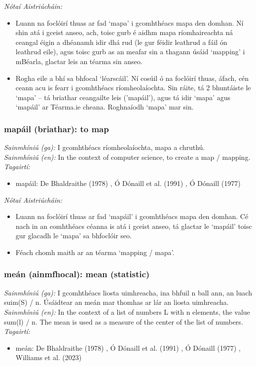 \documentclass{article}
\begin{document}
 \noindent \textit{Nótaí Aistriúcháin:}
\begin{itemize}
	\item Luann na foclóirí thuas ar fad `mapa' i gcomhthéacs mapa den domhan. Ní shin atá i gceist anseo, ach, toisc gurb é aidhm mapa ríomhaireachta ná ceangal éigin a dhéanamh idir dhá rud (le gur féidir leathrud a fáil ón leathrud eile), agus toisc gurb as an meafar sin a thagann úsáid `mapping' i mBéarla, glactar leis an téarma sin anseo.
	\item Rogha eile a bhí sa bhfocal `léarscáil'. Ní cosúil ó na foclóirí thuas, áfach, cén ceann acu is fearr i gcomhthéacs ríomheolaíochta. Sin ráite, tá 2 bhuntáiste le `mapa' -- tá briathar ceangailte leis ('mapáil'), agus tá idir `mapa' agus `mapáil' ar Téarma.ie cheana. Roghnaíodh `mapa' mar sin.
\end{itemize}


\subsubsection*{mapáil (briathar): to map}
 \noindent \textit{Sainmhíniú (ga):} I gcomhthéacs ríomheolaíochta, mapa a chruthú.
\\
 \noindent \textit{Sainmhíniú (en):} In the context of computer science, to create a map / mapping.
\\
 \noindent \textit{Tagairtí:}
\begin{itemize}
	\item mapáil: De Bhaldraithe (1978) \cite{de-bhaldraithe}, Ó Dónaill et al. (1991) \cite{focloir-beag}, Ó Dónaill (1977) \cite{odonaill}
\end{itemize}

 \noindent \textit{Nótaí Aistriúcháin:}
\begin{itemize}
	\item Luann na foclóirí thuas ar fad `mapáil' i gcomhthéacs mapa den domhan. Cé nach in an comhthéacs céanna is atá i gceist anseo, tá glactar le `mapáil' toisc gur glacadh le `mapa' sa bhfoclóir seo.
	\item Féach chomh maith ar an téarma `mapping / mapa'.
\end{itemize}


\subsubsection*{meán (ainmfhocal): mean (statistic)}
 \noindent \textit{Sainmhíniú (ga):} I gcomhthéacs liosta uimhreacha, ina bhfuil n ball ann, an luach suim(S) / n. Úsáidtear an meán mar thomhas ar lár an liosta uimhreacha.
\\
 \noindent \textit{Sainmhíniú (en):} In the context of a list of numbers L with n elements, the value sum(l) / n. The mean is used as a measure of the center of the list of numbers.
\\
 \noindent \textit{Tagairtí:}
\begin{itemize}
	\item meán: De Bhaldraithe (1978) \cite{de-bhaldraithe}, Ó Dónaill et al. (1991) \cite{focloir-beag}, Ó Dónaill (1977) \cite{odonaill}, Williams et al. (2023) \cite{storchiste}
\end{itemize}
\end{document}
